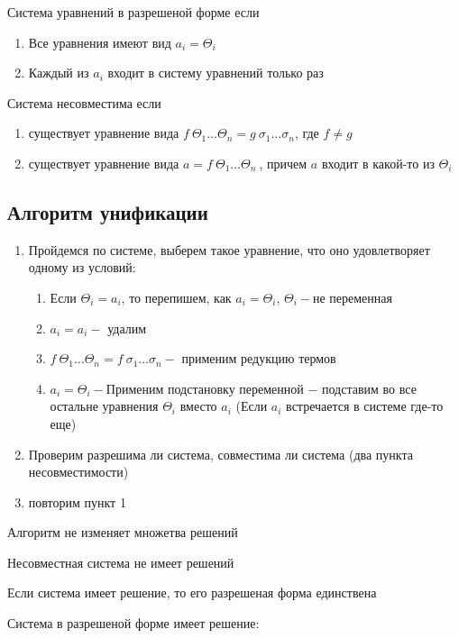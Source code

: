 		\begin{definition}Система уравнений в разрешеной форме если \end{definition}
			\begin{enumerate}
				\item Все уравнения имеют вид $a_i=\Theta_i$
				\item Каждый из $a_i$ входит в систему уравнений только раз
			\end{enumerate}
		\begin{definition}Система несовместима если\end{definition}
		\begin{enumerate}
			\item существует уравнение вида $f\:\Theta_1\hdots\Theta_n=g\:\sigma_1\hdots\sigma_n$, где $f\neq g$
			\item существует уравнение вида $a=f\:\Theta_1\hdots\Theta_n\:$, причем $a$ входит в какой-то из $\Theta_i$
		\end{enumerate}
		\subsection{ Алгоритм унификации}
		\begin{enumerate}
		\item Пройдемся по системе, выберем такое уравнение, что оно удовлетворяет одному из условий:\begin{enumerate}
			\item Если $\Theta_i=a_i$, то перепишем, как $a_i=\Theta_i$, $\Theta_i-$не переменная
			\item $a_i=a_i-$ удалим
			\item $f\:\Theta_1\hdots\Theta_n=f\:\sigma_1\hdots\sigma_n-$  применим редукцию термов
			\item $a_i=\Theta_i-$Применим подстановку переменной $-$ подставим во все остальне уравнения $\Theta_i$ вместо $a_i$ (Если $a_i$ встречается в системе где-то еще)
		\end{enumerate}
		\item Проверим разрешима ли система, совместима ли система (два пункта несовместимости)
		\item повторим пункт 1
		\end{enumerate}

		\begin{statement} Алгоритм не изменяет множетва решений\end{statement}
		\begin{statement} Несовместная система не имеет решений\end{statement}
		\begin{statement} Если система имеет решение, то его разрешеная форма единствена\end{statement}
		\begin{statement} Система в разрешеной форме имеет решение:\end{statement}

